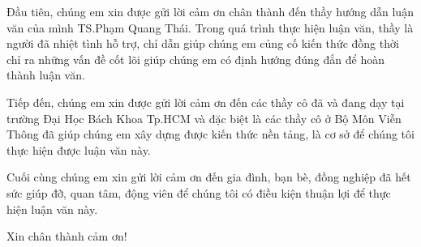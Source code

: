 

\vspace{\baselineskip}
Đầu tiên, chúng em xin được gửi lời cảm ơn chân thành đến thầy hướng dẫn luận văn của mình TS.Phạm Quang Thái. Trong quá trình thực hiện luận văn, thầy là người đã nhiệt tình hỗ trợ, chỉ dẫn giúp chúng em củng cố kiến thức đồng thời chỉ ra những vấn đề cốt lõi giúp  chúng em có định hướng đúng đắn để hoàn thành luận văn.
\vspace{\baselineskip}

Tiếp đến, chúng em xin được gửi lời cảm ơn đến các thầy cô đã và đang dạy tại trường Đại Học Bách Khoa Tp.HCM và đặc biệt là các thầy cô ở Bộ Môn Viễn Thông đã giúp chúng em xây dựng được kiến thức nền tảng, là cơ sở để chúng tôi thực hiện được luận văn này.
\vspace{\baselineskip}

Cuối cùng chúng em xin gửi lời cảm ơn đến gia đình, bạn bè, đồng nghiệp đã hết sức giúp đỡ, quan tâm, động viên để chúng tôi có điều kiện thuận lợi để thực hiện luận văn này.
\vspace{\baselineskip}


Xin chân thành cảm ơn!
